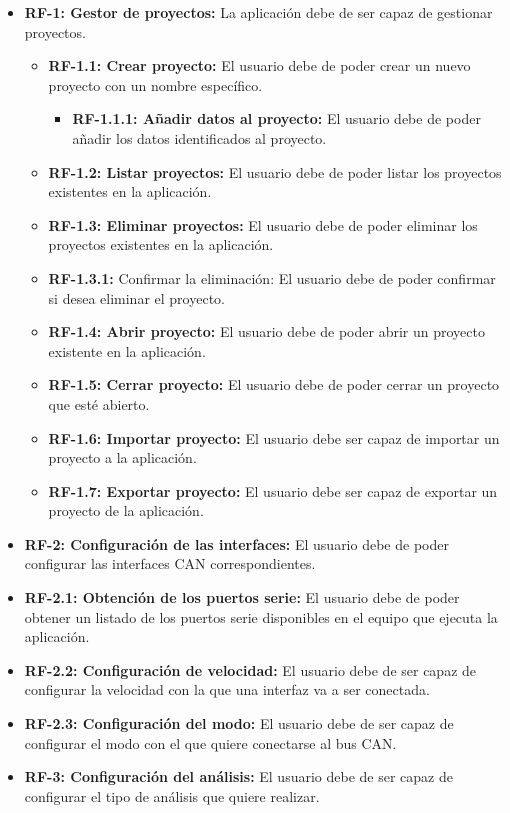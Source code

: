 \begin{itemize}
\item
\textbf{RF-1: Gestor de proyectos:} La aplicación debe de ser capaz de gestionar proyectos.
\begin{itemize}
\item
\textbf{RF-1.1: Crear proyecto:} El usuario debe de poder crear un nuevo proyecto con un nombre específico.
\begin{itemize}
\item
\textbf{RF-1.1.1: Añadir datos al proyecto:} El usuario debe de poder añadir los datos identificados al proyecto.
\end{itemize}
\item
\textbf{RF-1.2: Listar proyectos:} El usuario debe de poder listar los proyectos existentes en la aplicación.
\item
\textbf{RF-1.3: Eliminar proyectos:} El usuario debe de poder eliminar los proyectos existentes en la aplicación.
\item
\textbf{RF-1.3.1:} Confirmar la eliminación: El usuario debe de poder confirmar si desea eliminar el proyecto.
\item
\textbf{RF-1.4: Abrir proyecto:} El usuario debe de poder abrir un proyecto existente en la aplicación.
\item
\textbf{RF-1.5: Cerrar proyecto:} El usuario debe de poder cerrar un proyecto que esté abierto.
\item
\textbf{RF-1.6: Importar proyecto:} El usuario debe ser capaz de importar un proyecto a la aplicación.
\item
\textbf{RF-1.7: Exportar proyecto:} El usuario debe ser capaz de exportar un proyecto de la aplicación.
\end{itemize}
\item
\textbf{RF-2: Configuración de las interfaces:} El usuario debe de poder configurar las interfaces CAN correspondientes.
\item
\textbf{RF-2.1: Obtención de los puertos serie:} El usuario debe de poder obtener un listado de los puertos serie disponibles en el equipo que ejecuta la aplicación.
\item
\textbf{RF-2.2: Configuración de velocidad:} El usuario debe de ser capaz de configurar la velocidad con la que una interfaz va a ser conectada.
\item
\textbf{RF-2.3: Configuración del modo:} El usuario debe de ser capaz de configurar el modo con el que quiere conectarse al bus CAN.
\item
\textbf{RF-3: Configuración del análisis:} El usuario debe de ser capaz de configurar el tipo de análisis que quiere realizar.

\end{itemize}
